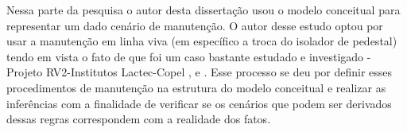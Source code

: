 Nessa parte da pesquisa o autor desta dissertação usou o modelo conceitual para representar um dado cenário de manutenção. O autor desse estudo optou por usar a manutenção em linha viva (em específico a troca do isolador de pedestal) tendo em vista o fato de que foi um caso bastante estudado e investigado - Projeto RV2-Institutos Lactec-Copel \cite{wesaac}, \cite{programa} e \cite{Gruber2018UsingGE}. Esse processo se deu por definir esses procedimentos de manutenção na estrutura do modelo conceitual e realizar as inferências com a finalidade de verificar se os cenários que podem ser derivados dessas regras correspondem com a realidade dos fatos. 